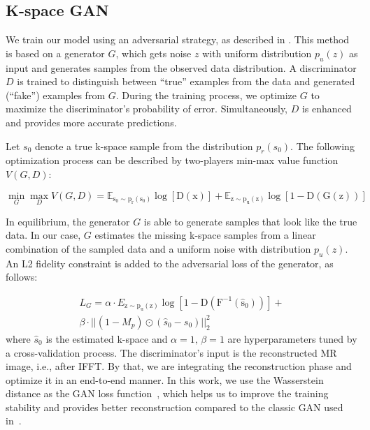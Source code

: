 \documentclass[review]{elsarticle}
\begin{document}
\subsection{K-space GAN}
We train our model using an adversarial strategy, as described in \cite{goodfellow2014generative,radford2015unsupervised}. 
This method is based on a generator $G$, which gets noise \textbf{$z$ }with uniform distribution \textbf{$p_{u}\left(z\right)$} as input and generates samples from the observed data distribution. A discriminator $D$ is trained to distinguish between ``true'' examples from the data and generated (``fake'') examples from $G.$ During the training process, we optimize $G$ to maximize the discriminator's probability of error. Simultaneously, $D$ is enhanced and provides more accurate predictions.

Let $s_{0}$ denote a true k-space sample from the distribution $p_{r}\left(s_{0}\right)$. The following optimization process can be described by two-players min-max value function $V(G,D)$:

\begin{equation}
\min_{G}\max_{D}V(G,D) = \mathbb{E_{\mathrm{s_{0}\sim p_{r}\left(s_{0}\right)}}\mathrm{\log\left[D\left(x\right)\right]}}+\mathbb{E_{\mathrm{z\sim p_{u}\left(z\right)}}\mathrm{\log\left[1-D\left(G(z)\right)\right]}}
\end{equation}

In equilibrium, the generator $G$ is able to generate samples that look like the true data. In our case, $G$ estimates the missing k-space samples from a linear combination of the sampled data and a uniform noise with distribution $p_{u}\left(z\right)$. An L2 fidelity constraint is added to the adversarial loss of the generator, as follows:

\begin{equation}
\begin{aligned}L_{G}=\alpha\cdot E_{\mathrm{z\sim p_{u}\left(z\right)}}\mathrm{\log\left[1-D\left(F^{-1}\left(\hat{s}_{0}\right)\right)\right]}+\\
\beta\cdot||\left(1-M_{p}\right)\odot\left(\hat{s}_{0}-s_{0}\right)||_{2}^{2}
\end{aligned}
\end{equation}
where $\hat{s}_{0}$ is the estimated k-space and $\alpha=1,\,\beta=1$ are hyperparameters tuned by a cross-validation process. The discriminator's input is the reconstructed MR image,\textbf{ }i.e.,\textbf{ }after IFFT. By that, we are integrating the reconstruction phase and optimize it in an end-to-end manner.
In this work, we use the Wasserstein distance as the GAN loss function~\cite{arjovsky2017wasserstein}, which helps us to improve the training stability and provides better reconstruction compared to the classic GAN used in~\cite{shitrit2017accelerated}.
\end{document}
